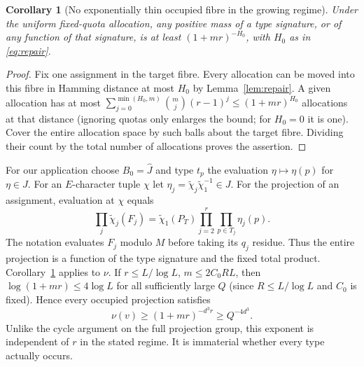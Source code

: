 \documentclass[11pt]{article}
\newtheorem{corollary}[theorem]{Corollary}
\theoremstyle{remark}\newtheorem{remark}[theorem]{Remark}
\begin{document}
\begin{corollary}[No exponentially thin occupied fibre in the growing regime]\label{cor:mass}
Under the uniform fixed-quota allocation, any positive mass of a type signature, or of any function of that signature, is at least $(1+mr)^{-H_0}$, with $H_0$ as in \eqref{eq:repair}.
\end{corollary}
\begin{proof}
Fix one assignment in the target fibre. Every allocation can be moved into this fibre in Hamming distance at most $H_0$ by Lemma~\ref{lem:repair}. A given allocation has at most $\sum_{j=0}^{\min(H_0,m)}\binom mj(r-1)^j\le(1+mr)^{H_0}$ allocations at that distance (ignoring quotas only enlarges the bound; for $H_0=0$ it is one). Cover the entire allocation space by such balls about the target fibre. Dividing their count by the total number of allocations proves the assertion.
\end{proof}

For our application choose $B_0=\widehat J$ and type $t_p$ the evaluation $\eta\mapsto\eta(p)$ for $\eta\in J$. For an $E$-character tuple $\chi$ let $\eta_j=\widetilde\chi_j\widetilde\chi_1^{-1}\in J$. For the projection of an assignment, evaluation at $\chi$ equals
\[
\prod_j\widetilde\chi_j(F_j)=\widetilde\chi_1(P_T)\prod_{j=2}^r\prod_{p\in T_j}\eta_j(p).
\]
The notation evaluates $F_j$ modulo $M$ before taking its $q_j$ residue. Thus the entire projection is a function of the type signature and the fixed total product. Corollary~\ref{cor:mass} applies to $\nu$. If $r\le L/\log L$, $m\le2C_0RL$, then $\log(1+mr)\le4\log L$ for all sufficiently large $Q$ (since $R\le L/\log L$ and $C_0$ is fixed). Hence every occupied projection satisfies
\begin{equation}\label{eq:mass}
\nu(v)\ge(1+mr)^{-d^3r}\ge Q^{-4d^3}.
\end{equation}
Unlike the cycle argument on the full projection group, this exponent is independent of $r$ in the stated regime. It is immaterial whether every type actually occurs.
\end{document}
